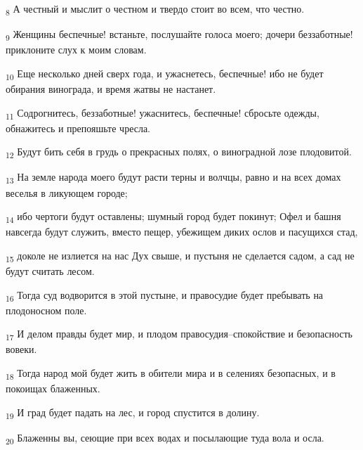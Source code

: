\begin{tcolorbox}
\textsubscript{8} А честный и мыслит о честном и твердо стоит во всем, что честно.
\end{tcolorbox}
\begin{tcolorbox}
\textsubscript{9} Женщины беспечные! встаньте, послушайте голоса моего; дочери беззаботные! приклоните слух к моим словам.
\end{tcolorbox}
\begin{tcolorbox}
\textsubscript{10} Еще несколько дней сверх года, и ужаснетесь, беспечные! ибо не будет обирания винограда, и время жатвы не настанет.
\end{tcolorbox}
\begin{tcolorbox}
\textsubscript{11} Содрогнитесь, беззаботные! ужаснитесь, беспечные! сбросьте одежды, обнажитесь и препояшьте чресла.
\end{tcolorbox}
\begin{tcolorbox}
\textsubscript{12} Будут бить себя в грудь о прекрасных полях, о виноградной лозе плодовитой.
\end{tcolorbox}
\begin{tcolorbox}
\textsubscript{13} На земле народа моего будут расти терны и волчцы, равно и на всех домах веселья в ликующем городе;
\end{tcolorbox}
\begin{tcolorbox}
\textsubscript{14} ибо чертоги будут оставлены; шумный город будет покинут; Офел и башня навсегда будут служить, вместо пещер, убежищем диких ослов и пасущихся стад,
\end{tcolorbox}
\begin{tcolorbox}
\textsubscript{15} доколе не излиется на нас Дух свыше, и пустыня не сделается садом, а сад не будут считать лесом.
\end{tcolorbox}
\begin{tcolorbox}
\textsubscript{16} Тогда суд водворится в этой пустыне, и правосудие будет пребывать на плодоносном поле.
\end{tcolorbox}
\begin{tcolorbox}
\textsubscript{17} И делом правды будет мир, и плодом правосудия--спокойствие и безопасность вовеки.
\end{tcolorbox}
\begin{tcolorbox}
\textsubscript{18} Тогда народ мой будет жить в обители мира и в селениях безопасных, и в покоищах блаженных.
\end{tcolorbox}
\begin{tcolorbox}
\textsubscript{19} И град будет падать на лес, и город спустится в долину.
\end{tcolorbox}
\begin{tcolorbox}
\textsubscript{20} Блаженны вы, сеющие при всех водах и посылающие туда вола и осла.
\end{tcolorbox}
